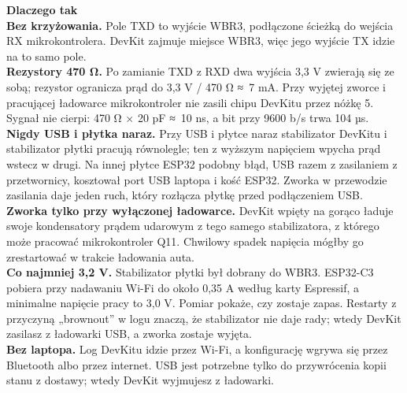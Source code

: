 \documentclass[10pt]{article}
\newcommand{\approxs}{{\sym ≈}}
\begin{document}
\vspace{8pt}
\textbf{Dlaczego tak}\\[2pt]
\textbf{Bez krzyżowania.} Pole TXD to wyjście WBR3, podłączone ścieżką do wejścia RX mikrokontrolera. DevKit zajmuje miejsce WBR3, więc jego wyjście TX idzie na to samo pole.\\
\textbf{Rezystory 470 {\sym Ω}.} Po zamianie TXD z RXD dwa wyjścia 3,3 V zwierają się ze sobą; rezystor ogranicza prąd do 3,3 V / 470 {\sym Ω} \approxs\ 7 mA. Przy wyjętej zworce i pracującej ładowarce mikrokontroler nie zasili chipu DevKitu przez nóżkę 5. Sygnał nie cierpi: 470 {\sym Ω} × 20 pF \approxs\ 10 ns, a bit przy 9600 b/s trwa 104 µs.\\
\textbf{Nigdy USB i płytka naraz.} Przy USB i płytce naraz stabilizator DevKitu i stabilizator płytki pracują równolegle; ten z wyższym napięciem wpycha prąd wstecz w drugi. Na innej płytce ESP32 podobny błąd, USB razem z zasilaniem z przetwornicy, kosztował port USB laptopa i kość ESP32. Zworka w przewodzie zasilania daje jeden ruch, który rozłącza płytkę przed podłączeniem USB.\\
\textbf{Zworka tylko przy wyłączonej ładowarce.} DevKit wpięty na gorąco ładuje swoje kondensatory prądem udarowym z tego samego stabilizatora, z którego może pracować mikrokontroler Q11. Chwilowy spadek napięcia mógłby go zrestartować w trakcie ładowania auta.\\
\textbf{Co najmniej 3,2 V.} Stabilizator płytki był dobrany do WBR3. ESP32-C3 pobiera przy nadawaniu Wi-Fi do około 0,35 A według karty Espressif, a minimalne napięcie pracy to 3,0 V. Pomiar pokaże, czy zostaje zapas. Restarty z przyczyną „brownout” w logu znaczą, że stabilizator nie daje rady; wtedy DevKit zasilasz z ładowarki USB, a zworka zostaje wyjęta.\\
\textbf{Bez laptopa.} Log DevKitu idzie przez Wi-Fi, a konfigurację wgrywa się przez Bluetooth albo przez internet. USB jest potrzebne tylko do przywrócenia kopii stanu z dostawy; wtedy DevKit wyjmujesz z ładowarki.
\end{document}
